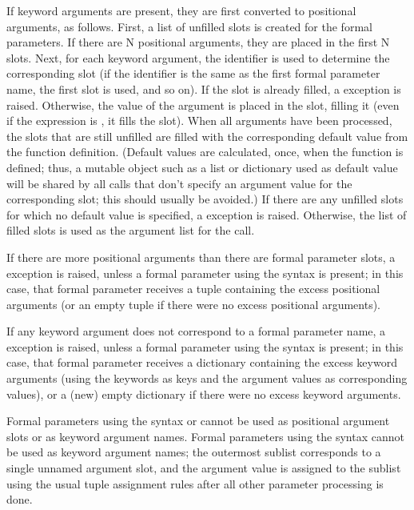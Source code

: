 If keyword arguments are present, they are first converted to
positional arguments, as follows.  First, a list of unfilled slots is
created for the formal parameters.  If there are N positional
arguments, they are placed in the first N slots.  Next, for each
keyword argument, the identifier is used to determine the
corresponding slot (if the identifier is the same as the first formal
parameter name, the first slot is used, and so on).  If the slot is
already filled, a  exception is raised.
Otherwise, the value of the argument is placed in the slot, filling it
(even if the expression is , it fills the slot).  When all
arguments have been processed, the slots that are still unfilled are
filled with the corresponding default value from the function
definition.  (Default values are calculated, once, when the function
is defined; thus, a mutable object such as a list or dictionary used
as default value will be shared by all calls that don't specify an
argument value for the corresponding slot; this should usually be
avoided.)  If there are any unfilled slots for which no default value
is specified, a  exception is raised.  Otherwise,
the list of filled slots is used as the argument list for the call.

If there are more positional arguments than there are formal parameter
slots, a  exception is raised, unless a formal
parameter using the syntax  is present; in this
case, that formal parameter receives a tuple containing the excess
positional arguments (or an empty tuple if there were no excess
positional arguments).

If any keyword argument does not correspond to a formal parameter
name, a  exception is raised, unless a formal
parameter using the syntax  is present; in this
case, that formal parameter receives a dictionary containing the
excess keyword arguments (using the keywords as keys and the argument
values as corresponding values), or a (new) empty dictionary if there
were no excess keyword arguments.

Formal parameters using the syntax  or
 cannot be used as positional argument slots or
as keyword argument names.  Formal parameters using the syntax
 cannot be used as keyword argument names; the
outermost sublist corresponds to a single unnamed argument slot, and
the argument value is assigned to the sublist using the usual tuple
assignment rules after all other parameter processing is done.

